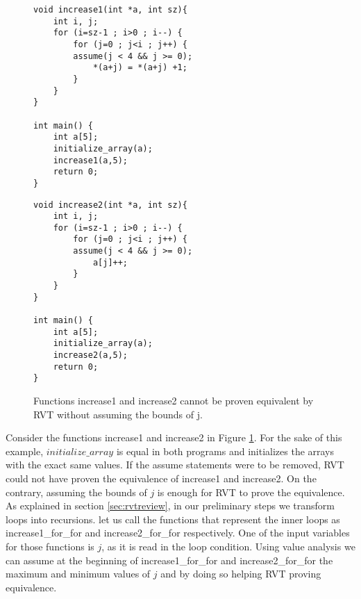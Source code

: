 \begin{figure}[h]
\begin{center}
\begin{minipage}{8 cm}


\begin{lstlisting}
void increase1(int *a, int sz){
    int i, j;
    for (i=sz-1 ; i>0 ; i--) {
        for (j=0 ; j<i ; j++) {
	    assume(j < 4 && j >= 0);
            *(a+j) = *(a+j) +1;
        }
    }
}

int main() {
    int a[5];
    initialize_array(a);
    increase1(a,5);
    return 0;
}

\end{lstlisting}
\end{minipage}
\begin{minipage}{8 cm}
\begin{lstlisting}
void increase2(int *a, int sz){
    int i, j;
    for (i=sz-1 ; i>0 ; i--) {
        for (j=0 ; j<i ; j++) {
	    assume(j < 4 && j >= 0);
            a[j]++;
        }
    }
}

int main() {
    int a[5];
    initialize_array(a);
    increase2(a,5);
    return 0;
}
\end{lstlisting}
    


\end{minipage}
\caption{ Functions increase1 and increase2 cannot be proven equivalent by RVT without assuming the bounds of j.}
\label{fig:vaExample}
\end{center}
\end{figure}

\begin{example}
Consider the functions increase1 and increase2 in Figure \ref{fig:vaExample}. For the sake of this example, $initialize\_array$ is equal in both programs and initializes the arrays with the exact same values. If the assume statements were to be removed, RVT could not have proven the equivalence of increase1 and increase2. On the contrary, assuming the bounds of $j$ is enough for RVT to prove the equivalence. As explained in section \ref{sec:rvtreview}, in our preliminary steps we transform loops into recursions. let us call the functions that represent the inner loops as increase1\_for\_for and increase2\_for\_for respectively. One of the input variables for those functions is $j$, as it is read in the loop condition. Using value analysis we can assume at the beginning of increase1\_for\_for and increase2\_for\_for the maximum and minimum values of $j$ and by doing so helping RVT proving equivalence.
\end{example}

